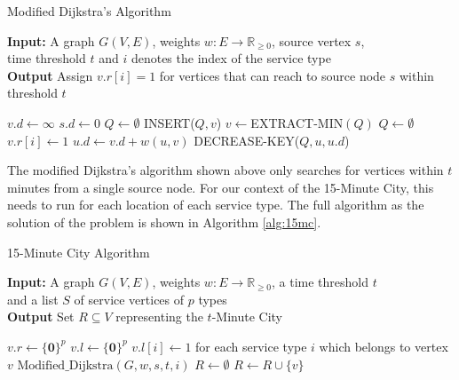 \begin{algorithm}[H]
    \caption{Modified Dijkstra's Algorithm} \label{alg:modified_dijsktra}
    \textbf{Input:} A graph $G(V,E)$, weights $w:E\rightarrow\mathbb{R}_{\geq 0}$, source vertex $s$, \\  time threshold $t$ and $i$ denotes the index of the service type\\
    \textbf{Output} Assign $v.r[i]=1$ for vertices that can reach to source node $s$ within threshold $t$ %
    \begin{algorithmic}
            \State $v.d\gets\infty$
        \EndFor
        \State $s.d\gets 0$
        \State $Q\gets\emptyset$
            \State INSERT($Q,v$)
        \EndFor
            \State $v\gets$EXTRACT-MIN$(Q)$
                \State $Q\gets\emptyset$ 
            \Else
                \State $v.r[i] \gets 1 $
                        \State $u.d\gets v.d+w(u,v)$
                        \State DECREASE-KEY($Q,u,u.d$)
                    \EndIf
                \EndFor
            \EndIf
        \EndWhile
    \end{algorithmic}
\end{algorithm}

The modified Dijkstra's algorithm shown above only searches for vertices within $t$ minutes from a single source node. For our context of the 15-Minute City, this needs to run for each location of each service type. The full algorithm as the solution of the problem is shown in Algorithm \ref{alg:15mc}.

\begin{algorithm}[H]
    \caption{15-Minute City Algorithm}\label{alg:15mc}
    \textbf{Input:} A graph $G(V,E)$, weights $w:E\rightarrow\mathbb{R}_{\geq 0}$, a time threshold $t$ \\  and a list $S$ of service vertices of $p$ types\\
    \textbf{Output} Set $R\subseteq V$ representing the $t$-Minute City
    \begin{algorithmic}
            \State $v.r \gets \{\mathbf{0}\}^{p}$
            \State $v.l \gets \{\mathbf{0}\}^{p}$
        \EndFor
            \State $v.l[i] \gets 1$ for each service type $i$ which belongs to vertex $v$
        \EndFor
                \State $\text{Modified\_Dijkstra}(G,w,s,t,i)$
            \EndFor
        \EndFor
        \State $R\gets\emptyset$
                \State $R \gets R\cup \{v\}$
            \EndIf
        \EndFor
    \end{algorithmic}
\end{algorithm}

